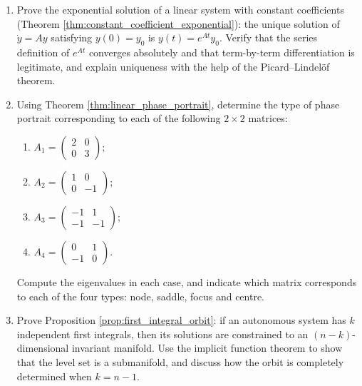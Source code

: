 \begin{enumerate}[leftmargin=3em, label=\textbf{Exercise \arabic*}]
    \item Prove the exponential solution of a linear system with constant coefficients (Theorem \ref{thm:constant_coefficient_exponential}):
    the unique solution of $\dot{y}=Ay$ satisfying $y(0)=y_0$ is $y(t)=e^{At}y_0$.
    Verify that the series definition of $e^{At}$ converges absolutely and that term-by-term differentiation is legitimate,
    and explain uniqueness with the help of the Picard--Lindelöf theorem.

    \item Using Theorem \ref{thm:linear_phase_portrait}, determine the type of phase portrait corresponding to each of the following $2\times2$ matrices:
    \begin{enumerate}[label=(\roman*)]
        \item $A_1=\begin{pmatrix}2&0\\0&3\end{pmatrix}$;
        \item $A_2=\begin{pmatrix}1&0\\0&-1\end{pmatrix}$;
        \item $A_3=\begin{pmatrix}-1&1\\-1&-1\end{pmatrix}$;
        \item $A_4=\begin{pmatrix}0&1\\-1&0\end{pmatrix}$.
    \end{enumerate}
    Compute the eigenvalues in each case, and indicate which matrix corresponds to each of the four types: node, saddle, focus and centre.

    \item Prove Proposition \ref{prop:first_integral_orbit}:
    if an autonomous system has $k$ independent first integrals, then its solutions are constrained to an $(n-k)$-dimensional invariant manifold.
    Use the implicit function theorem to show that the level set is a submanifold,
    and discuss how the orbit is completely determined when $k=n-1$.


\end{enumerate}
